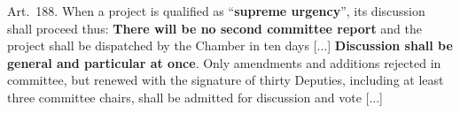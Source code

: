 \documentclass[letter,12pt]{article}
\begin{document}

\singlespacing

Art.~188. When a project is qualified as ``\textbf{supreme urgency}'', its discussion shall proceed thus: \textbf{There will be no second committee report} and the project shall be dispatched by the Chamber in ten days [...] \textbf{Discussion shall be general and particular at once}. Only amendments and additions rejected in committee, but renewed with the signature of thirty Deputies, including at least three committee chairs, shall be admitted for discussion and vote [...]
\end{document}
